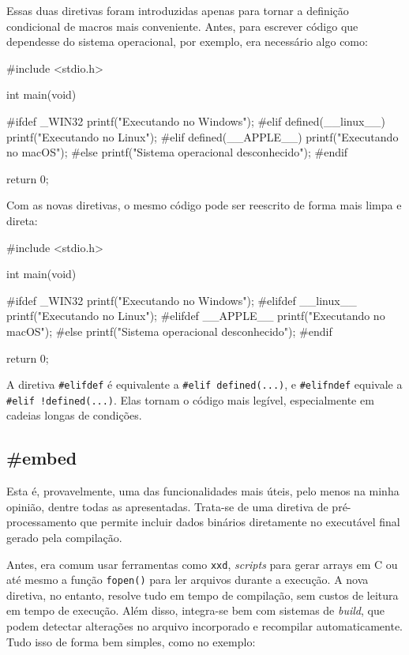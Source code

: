 Essas duas diretivas foram introduzidas apenas para tornar a definição 
condicional de macros mais conveniente. Antes, para escrever código que 
dependesse do sistema operacional, por exemplo, era necessário algo como:

\begin{excode}
#include <stdio.h>

int main(void)
{
    #ifdef _WIN32
        printf("Executando no Windows\n");
    #elif defined(__linux__)
        printf("Executando no Linux\n");
    #elif defined(__APPLE__)
        printf("Executando no macOS\n");
    #else
        printf("Sistema operacional desconhecido\n");
    #endif

    return 0;
}
\end{excode}

Com as novas diretivas, o mesmo código pode ser reescrito de forma mais limpa e 
direta:

\begin{excode}
#include <stdio.h>

int main(void)
{
    #ifdef _WIN32
    printf("Executando no Windows\n");
    #elifdef __linux__
        printf("Executando no Linux\n");
    #elifdef __APPLE__
        printf("Executando no macOS\n");
    #else
        printf("Sistema operacional desconhecido\n");
    #endif

    return 0;
}
\end{excode}

A diretiva \texttt{\#elifdef} é equivalente a \texttt{\#elif defined(...)}, e 
\texttt{\#elifndef} equivale a \texttt{\#elif !defined(...)}. Elas tornam o código 
mais legível, especialmente em cadeias longas de condições.

\subsection{\#embed}

Esta é, provavelmente, uma das funcionalidades mais úteis, pelo menos na minha 
opinião, dentre todas as apresentadas. Trata-se de uma diretiva de 
pré-processamento que permite incluir dados binários diretamente no executável 
final gerado pela compilação.

Antes, era comum usar ferramentas como \texttt{xxd}, \textit{scripts} para gerar 
arrays em C ou até mesmo a função \texttt{fopen()} para ler arquivos durante a 
execução. A nova diretiva, no entanto, resolve tudo em tempo de compilação, sem 
custos de leitura em tempo de execução. Além disso, integra-se bem com sistemas 
de \textit{build}, que podem detectar alterações no arquivo incorporado e 
recompilar automaticamente. Tudo isso de forma bem simples, como no exemplo:

